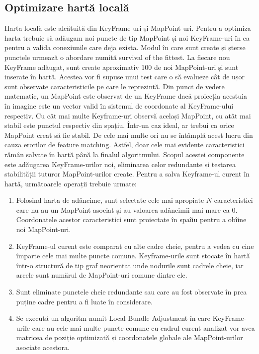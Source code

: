 \documentclass[12pt,a4paper]{report}
\begin{document}
\subsection{Optimizare hartă locală}
Harta locală este alcătuită din KeyFrame-uri și MapPoint-uri. Pentru a optimiza
harta trebuie să adăugam noi puncte de tip MapPoint și noi KeyFrame-uri în ea 
pentru a valida conexiunile care deja exista. Modul în care sunt create și șterse 
punctele urmează o abordare numită survival of the fittest. La fiecare nou KeyFrame 
adăugat, sunt create aproximativ 100 de noi MapPoint-uri și sunt inserate în hartă. Acestea
vor fi supuse unui test care o să evalueze cât de ușor sunt observate caracteristicile pe care
le reprezintă. Din punct de vedere matematic, un MapPoint este observat de un KeyFrame
dacă proiecția acestuia în imagine este un vector valid în sistemul de coordonate 
al KeyFrame-ului respectiv. Cu cât mai multe Keyframe-uri observă același MapPoint,
cu atât mai stabil este punctul respectiv din spațiu. Într-un caz ideal, ar trebui ca
orice MapPoint creat să fie stabil. De cele mai multe ori nu se întâmplă acest lucru din
cauza erorilor de feature matching. Astfel, doar cele mai evidente caracteristici rămân 
salvate în hartă până la finalul algoritmului. Scopul acestei componente este adăugarea 
KeyFrame-urilor noi, eliminarea celor redundante și testarea stabilității tuturor MapPoint-urilor
create. Pentru a salva Keyframe-ul curent în hartă, următoarele operații trebuie urmate:
\begin{enumerate}
    \item Folosind harta de adâncime, sunt selectate cele mai apropiate \( N \) caracteristici 
    care nu au un MapPoint asociat și au valoarea adâncimii mai mare ca 0.
    Coordonatele acestor caracteristici sunt proiectate în spaîiu pentru a obîine noi MapPoint-uri.      
    \item KeyFrame-ul curent este comparat cu alte cadre cheie, pentru a vedea cu cine împarte 
    cele mai multe puncte comune. Keyframe-urile sunt stocate în hartă într-o structură de tip 
    graf neorientat unde nodurile sunt cadrele cheie, iar arcele sunt numărul de MapPoint-uri comune 
    dintre ele.
    \item Sunt eliminate punctele cheie redundante sau care au fost observate în prea puține 
    cadre pentru a fi luate în considerare.
    \item Se execută un algoritm numit Local Bundle Adjustment în care KeyFrame-urile 
    care au cele mai multe puncte comune cu cadrul curent analizat vor avea matricea de
    poziție optimizată și coordonatele globale ale MapPoint-urilor asociate acestora.
\end{enumerate} 
 
\end{document}
